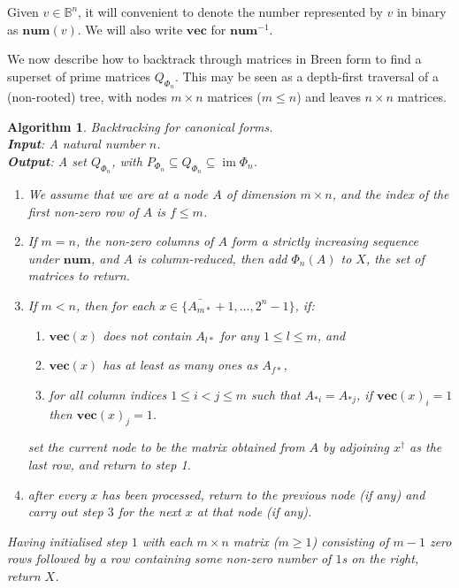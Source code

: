\documentclass[11pt]{article}
\newtheorem{algo}[thm]{Algorithm}
\newenvironment{alg}{\begin{algo}\rm}{\end{algo}}
\numberwithin{equation}{section}
\DeclareMathOperator{\im}{im}
\newcommand{\num}{\mathbf{num}}
\newcommand{\vect}{\mathbf{vec}}
\newcommand{\B}{\mathbb{B}}
\begin{document}
Given $v \in \B^n$, it will convenient to denote the number represented by $v$
in binary as $\num(v)$. We will also write $\vect$ for $\mathbf{num}^{-1}$.

We now describe how to backtrack through matrices in Breen form to find a
superset of prime matrices $Q_{\Phi_n}$. This may be seen as a depth-first
traversal of a (non-rooted) tree, with nodes $m\times n$ matrices ($m \leq
n$) and leaves $n \times n$ matrices.

\begin{alg}
  Backtracking for canonical forms.\\
  \textbf{Input}: A natural number $n$. \\
  \textbf{Output}: A set $Q_{\Phi_n}$, with $P_{\Phi_n} \subseteq Q_{\Phi_n}
  \subseteq \im\Phi_n$.
  \begin{enumerate}
    \item We assume that we are at a node $A$ of dimension $m \times n$, and the
      index of the first non-zero row of $A$ is $f \leq m$. 
    \item If $m = n$, the non-zero columns of $A$ form a strictly increasing
      sequence under $\num$, and $A$ is column-reduced, then add $\Phi_n(A)$ to
      $X$, the set of matrices to return.
    \item If $m < n$, then for each $x \in \{\bar{A_{m*}} + 1,
        \ldots, 2^n - 1\}$, if:
      \begin{enumerate}[label={(\roman*)}]
        \item $\vect(x)$ does not contain $A_{l*}$ for any $1 \leq l \leq m$,
          and
        \item $\vect(x)$ has at least as many ones as $A_{f*}$,
        \item for all column indices $1 \leq i < j \leq m$ such that $A_{*i} =
          A_{*j}$, if $\vect(x)_i = 1$ then $\vect(x)_j = 1$.
      \end{enumerate}
      set the current node to be the matrix obtained from $A$ by adjoining
      $x^\dagger$ as the last row, and return to step 1.
    \item after every $x$ has been processed, return to the previous node (if
      any) and carry out step $3$ for the next $x$ at that node (if any).
  \end{enumerate}
  Having initialised step $1$ with each $m \times n$ matrix ($m \geq 1$)
  consisting of $m - 1$ zero rows followed by a row containing some non-zero
  number of $1$s on the right, return $X$.
\end{alg}
\end{document}
